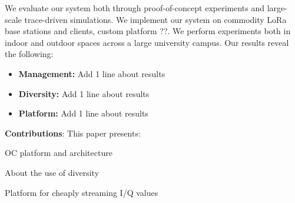We evaluate our system both through proof-of-concept experiments and large-scale trace-driven simulations. We implement our system on commodity LoRa base stations and clients, {\color{blue} custom platform ??}. We perform experiments both in indoor and outdoor spaces across a large university campus. Our results reveal the following:

\begin{itemize}
\item \textbf{Management: } {\color{blue} Add 1 line about results} 
\item \textbf{Diversity: } {\color{blue} Add 1 line about results}
\item \textbf{Platform: } {\color{blue} Add 1 line about results}
\end{itemize}

\textbf{Contributions}: This paper presents:
\begin{tightitem}
\item OC platform and architecture
\item About the use of diversity
\item Platform for cheaply streaming I/Q values
\end{tightitem}
